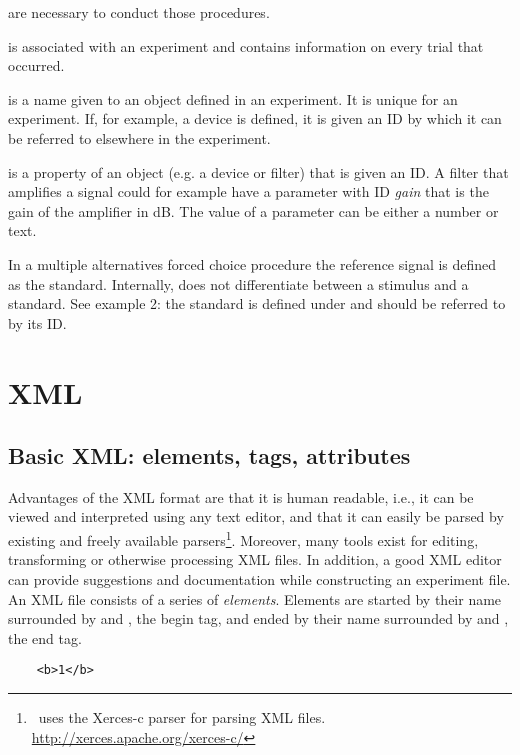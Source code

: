 {\begin{description}
are necessary to conduct those procedures. \item[result] is
associated with an experiment and contains information on every
trial that occurred. \item[ID] is a name given to an object
defined in an experiment. It is unique for an experiment. If, for
example, a device is defined, it is given an ID by which it can be
referred to elsewhere in the experiment. \item[parameter] is a
property of an object (e.g. a device or filter) that is given an
ID. A filter that amplifies a signal could for example have a
parameter with ID \emph{gain} that is the gain of the amplifier in
dB. The value of a parameter can be either a number or text.
\item[standard] In a multiple alternatives forced choice procedure
the reference signal is defined as the standard. Internally, \apex
does not differentiate between a stimulus and a standard. See
example 2: the standard is defined under  and
should be referred to by its ID.

\end{description}

\section{XML}

\label{sec:xml}

\subsection{Basic XML: elements, tags, attributes}
\label{sec:BasicXML:elements,tags,attributes}


Advantages of the XML format are that it is human readable, i.e.,
it can be viewed and interpreted using any text editor, and that
it can easily be parsed by existing and freely available
parsers\footnote{\apex\ uses the Xerces-c parser for parsing XML
files. \url{http://xerces.apache.org/xerces-c/}}. Moreover, many
tools exist for editing, transforming or otherwise processing XML
files. In addition, a good XML editor can provide suggestions and
documentation while constructing an experiment file. An XML file
consists of a series of \emph{elements}. Elements are started by
their name surrounded by \xml{<} and \xml{>}, the begin tag, and
ended by their name surrounded by \xml{</} and \xml{>}, the end
tag.
\begin{lstlisting}
    <b>1</b>
\end{lstlisting}


}
